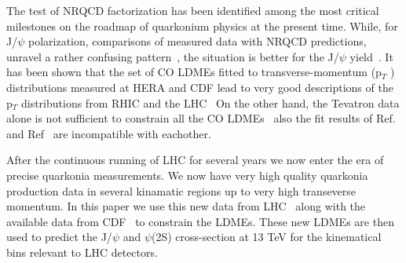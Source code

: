 \documentclass[aps,prc,preprint,superscriptaddress,showpacs,showkeys,amsmath]{revtex4-1}
\begin{document}
The test of NRQCD factorization has been identified among the most critical
milestones on the roadmap of quarkonium physics at the present time. While, for
J/$\psi$ polarization, comparisons of measured data with NRQCD predictions,
unravel a rather confusing pattern~\cite{Butenschoen:2012px,Chao:2012iv,Gong:2012ug}, the situation is 
better for the J/$\psi$ yield~\cite{Gong:2012ug,Butenschoen:2010rq,Ma:2010jj}. It has been shown 
that the set of CO LDMEs fitted to transverse-momentum (p$_{T}$ ) distributions
measured at HERA and CDF lead to very good descriptions of 
the p$_{T}$ distributions from RHIC and the LHC~\cite{Butenschoen:2010rq} 
On the other hand, the Tevatron data alone is not sufficient to constrain
all the CO LDMEs~\cite{Ma:2010jj} also the fit results of 
Ref.~\cite{Butenschoen:2010rq} and  Ref~\cite{Ma:2010jj} are incompatible with 
eachother.

After the continuous running of LHC for several years we now enter the era 
of precise quarkonia measurements. We now have very high quality quarkonia 
production data in several kinamatic 
regions up to very high transeverse momentum. In this paper we use this new
data from LHC~\cite{Chatrchyan:2011kc,Khachatryan:2015rra,Aad:2015duc} along with 
the available data from CDF~\cite{Acosta:2004yw,Abe:1997yz} to constrain 
the LDMEs. These new LDMEs are then used to predict the J/$\psi$ and $\psi$(2S)
cross-section at 13 TeV for the kinematical bins relevant to LHC detectors.



\end{document}
